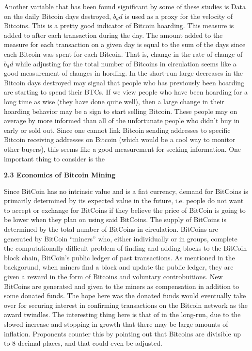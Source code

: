 \documentclass{article}[10 pt]
\newcommand{\vs}{\vspace{0.1in}}
\begin{document}
Another variable that has been found significant by some of these studies is 
Data on the daily Bitcoin days destroyed,
$b_dd$ is used as a proxy for the velocity of Bitcoins. This is a pretty
good indicator of Bitcoin hoarding. This measure is added to after each
transaction during the day. The amount added to the measure for each
transaction on a given day is equal to the sum of the days since each
Bitcoin was spent for each Bitcoin. That is, change in the rate of change of
$b_dd$ while adjusting for the total number of Bitcoins in circulation
seems like a good measurement of changes in hording. In the short-run large
decreases in the Bitcoin days destroyed may signal that people who has
previously been hoarding are starting to spend their BTCs. If we view people
who have been hoarding for a long time as wise (they have done quite well), 
then a large change in their hoarding behavior may be a sign to start
selling Bitcoin. These people may on average by more informed than all of
the unfortunate people who didn't buy in early or sold out. Since one cannot
link Bitcoin sending addresses to specific Bitcoin receiving addresses on
Bitcoin (which would be a cool way to monitor other buyers), this seems
like a good measurement for seeking information. One important thing to
consider is the 

\vs


\textbf{2.3 Economics of Bitcoin Mining}

\vs

Since BitCoin has no intrinsic value and is a fiat currency, demand for
BitCoins is primarily determined by its expected value in the future, i.e.
people do not want to accept or exchange for BitCoins if they believe the
price of BitCoin is going to be lower when they plan on using said BitCoins.
The supply of BitCoins is determined by the total number of BitCoins in
circulation. BitCoins are generated by BitCoin “miners” who, either
individually or in groups, complete the computationally difficult problem of
finding and adding blocks to the BitCoin block chain, BitCoin’s public
ledger of past transactions. As mentioned in the backgorund, when miners find a block and update the public
ledger, they are given a reward in the form of Bitcoins and voluntary
controbuitions. New BitCoins are generated and given to the miners as
compensation in addition to some donated funds. The hope here was the
donated funds would eventually take over for securing interest in confirming
transactions on the Bitcoin network as the award twindles. The interesting
thing here is that of in the long-run, due to the slowed increase and
stopping in growth that there may be large amounts of inflation. Proponents
counter this by pointing out that Bitcoins are divisible up to 8 decimal
places, and that could even be adjusted.
\end{document}
